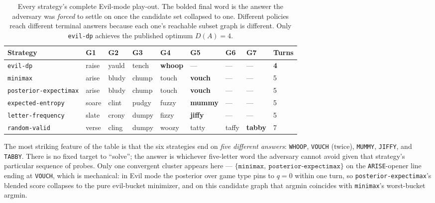 \documentclass[11pt]{article}
\begin{document}
\begin{table}[h]
\centering\footnotesize
\renewcommand{\arraystretch}{1.05}
\begin{tabular}{@{}l l l l l l l l l@{}}
\toprule
Strategy & G1 & G2 & G3 & G4 & G5 & G6 & G7 & Turns\\
\midrule
\texttt{evil-dp}              & raise & yauld & tench & \textbf{whoop} & --- & --- & --- & \textbf{4}\\
\texttt{minimax}              & arise & bludy & chump & touch & \textbf{vouch} & --- & --- & 5\\
\texttt{posterior-expectimax} & arise & bludy & chump & touch & \textbf{vouch} & --- & --- & 5\\
\texttt{expected-entropy}     & soare & clint & pudgy & fuzzy & \textbf{mummy} & --- & --- & 5\\
\texttt{letter-frequency}     & slate & crony & dumpy & fizzy & \textbf{jiffy} & --- & --- & 5\\
\texttt{random-valid}         & verse & cling & dumpy & woozy & tatty & taffy & \textbf{tabby} & 7\\
\bottomrule
\end{tabular}
\caption{Every strategy's complete Evil-mode play-out. The bolded
final word is the answer the adversary was \emph{forced} to settle on
once the candidate set collapsed to one. Different policies reach
different terminal answers because each one's reachable subset graph
is different. Only \texttt{evil-dp} achieves the published optimum
$D(A)=4$.}
\label{tab:aback-trace-evil}
\end{table}

The most striking feature of the table is that the six strategies
end on \emph{five different answers}: \texttt{WHOOP},
\texttt{VOUCH} (twice), \texttt{MUMMY}, \texttt{JIFFY}, and
\texttt{TABBY}. There is no fixed target to ``solve''; the answer
is whichever five-letter word the adversary cannot avoid given
that strategy's particular sequence of probes. Only one convergent
cluster appears here ---
$\{\texttt{minimax},\ \texttt{posterior-expectimax}\}$ on the
\texttt{ARISE}-opener line ending at \texttt{VOUCH}, which is
mechanical: in Evil mode the posterior over game type pins to $q=0$
within one turn, so \texttt{posterior-expectimax}'s blended score
collapses to the pure evil-bucket minimizer, and on this candidate
graph that argmin coincides with \texttt{minimax}'s worst-bucket
argmin.
\end{document}
